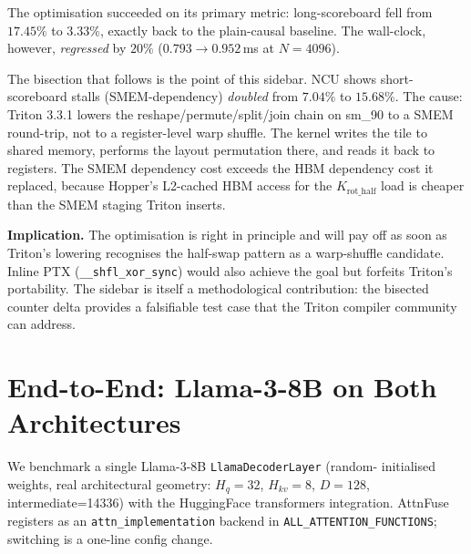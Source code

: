 \documentclass[10pt,twocolumn]{article}
\begin{document}
The optimisation succeeded on its primary metric:
long-scoreboard fell from $17.45\%$ to $3.33\%$, exactly back to
the plain-causal baseline. The wall-clock, however,
\emph{regressed} by $20\%$ ($0.793 \to 0.952$\,ms at $N{=}4096$).

\begin{negresult}
The bisection that follows is the point of this sidebar. NCU shows
short-scoreboard stalls (SMEM-dependency) \emph{doubled} from
$7.04\%$ to $15.68\%$. The cause: Triton 3.3.1 lowers the
reshape/permute/split/join chain on sm\_90 to a SMEM round-trip,
not to a register-level warp shuffle. The kernel writes the tile to
shared memory, performs the layout permutation there, and reads it
back to registers. The SMEM dependency cost exceeds the HBM
dependency cost it replaced, because Hopper's L2-cached HBM access
for the $K_\text{rot\_half}$ load is cheaper than the SMEM staging
Triton inserts.

\textbf{Implication.} The optimisation is right in principle and
will pay off as soon as Triton's lowering recognises the half-swap
pattern as a warp-shuffle candidate. Inline PTX
(\texttt{\_\_shfl\_xor\_sync}) would also achieve the goal but
forfeits Triton's portability. The sidebar is itself a
methodological contribution: the bisected counter delta provides a
falsifiable test case that the Triton compiler community can address.
\end{negresult}

\section{End-to-End: Llama-3-8B on Both Architectures}
\label{sec:e2e}

We benchmark a single Llama-3-8B \texttt{LlamaDecoderLayer} (random-
initialised weights, real architectural geometry: $H_q{=}32$,
$H_{kv}{=}8$, $D{=}128$, intermediate=14336) with the HuggingFace
transformers integration. AttnFuse registers as an
\texttt{attn\_implementation} backend in
\texttt{ALL\_ATTENTION\_FUNCTIONS}; switching is a one-line config
change.
\end{document}

